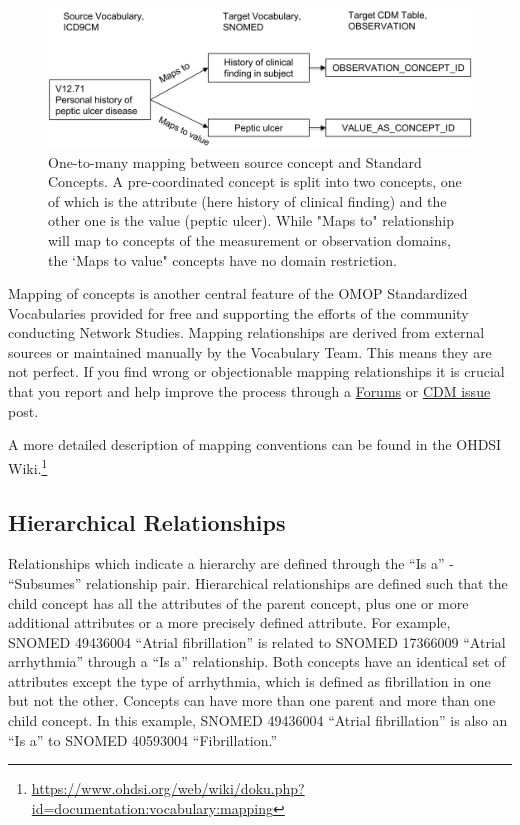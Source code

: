\documentclass[11pt]{book}
\let\rmarkdownfootnote\footnote%
\def\footnote{\protect\rmarkdownfootnote}
\theoremstyle{definition}
\theoremstyle{definition}
\theoremstyle{definition}
\theoremstyle{remark}
\begin{document}
\begin{figure}

{\centering \includegraphics[width=1\linewidth]{images/StandardizedVocabularies/conceptValue} 

}

\caption{One-to-many mapping between source concept and Standard Concepts. A pre-coordinated concept is split into two concepts, one of which is the attribute (here history of clinical finding) and the other one is the value (peptic ulcer). While "Maps to" relationship will map to concepts of the measurement or observation domains, the ‘Maps to value" concepts have no domain restriction.}\label{fig:conceptValue}
\end{figure}

Mapping of concepts is another central feature of the OMOP Standardized
Vocabularies provided for free and supporting the efforts of the
community conducting Network Studies. Mapping relationships are derived
from external sources or maintained manually by the Vocabulary Team.
This means they are not perfect. If you find wrong or objectionable
mapping relationships it is crucial that you report and help improve the
process through a \href{https://forums.ohdsi.org}{Forums} or
\href{https://github.com/OHDSI/CommonDataModel/issues}{CDM issue} post.

A more detailed description of mapping conventions can be found in the
OHDSI Wiki.\footnote{\url{https://www.ohdsi.org/web/wiki/doku.php?id=documentation:vocabulary:mapping}}

\subsection{Hierarchical
Relationships}\label{hierarchical-relationships}

Relationships which indicate a hierarchy are defined through the ``Is
a'' - ``Subsumes'' relationship pair. Hierarchical relationships are
defined such that the child concept has all the attributes of the parent
concept, plus one or more additional attributes or a more precisely
defined attribute. For example, SNOMED 49436004 ``Atrial fibrillation''
is related to SNOMED 17366009 ``Atrial arrhythmia'' through a ``Is a''
relationship. Both concepts have an identical set of attributes except
the type of arrhythmia, which is defined as fibrillation in one but not
the other. Concepts can have more than one parent and more than one
child concept. In this example, SNOMED 49436004 ``Atrial fibrillation''
is also an ``Is a'' to SNOMED 40593004 ``Fibrillation.''
\end{document}
